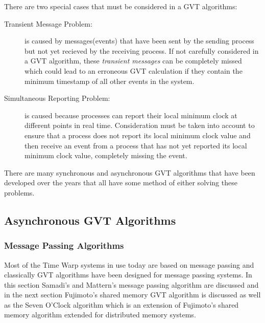 \documentclass[11pt]{book}
\begin{document}
There are two special cases that must be considered in a GVT algorithms:

\begin{description}
    \item[Transient Message Problem:] is caused by messages(events) that have been sent by the
      sending process but not yet recieved by the receiving process.  If not carefully considered in
      a GVT algorithm, these \emph{transient messages} can be completely missed which could lead to
      an erroneous GVT calculation if they contain the minimum timestamp of all other events in the
      system.
    \item[Simultaneous Reporting Problem:] is caused because processes can report their local
      minimum clock at different points in real time.  Consideration must be taken into account to
      ensure that a process does not report its local minimum clock value and then receive an event
      from a process that has not yet reported its local minimum clock value, completely missing the
      event.
\end{description}

\noindent
There are many synchronous and asynchronous GVT algorithms that have been developed over the years
that all have some method of either solving these problems.

\subsection{Asynchronous GVT Algorithms}

\subsubsection{Message Passing Algorithms}

Most of the Time Warp systems in use today are based on message passing and classically GVT
algorithms have been designed for message passing systems.  In this section Samadi's and Mattern's
message passing algorithm \cite{samadi-85} are discussed and in the next section Fujimoto's shared
memory GVT algorithm \cite{fujimoto-94} is discussed as well as the Seven O'Clock algorithm
\cite{bauer-05} which is an extension of Fujimoto's shared memory algorithm extended for distributed
memory systems.
\end{document}
